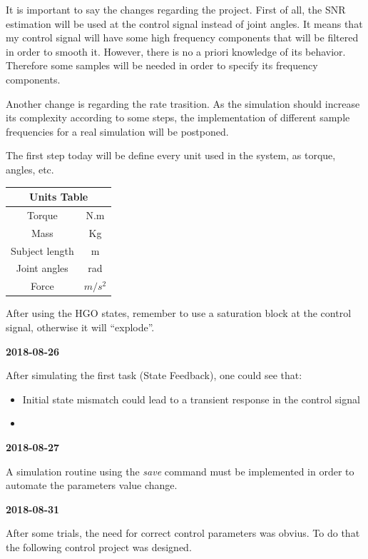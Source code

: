 It is important to say the changes regarding the project. First of all, the SNR estimation will be used at the control signal instead of joint angles. It means that my control signal will have some high frequency components that will be filtered in order to smooth it. However, there is no a priori knowledge of its behavior. Therefore some samples will be needed in order to specify its frequency components.

Another change is regarding the rate trasition. As the simulation should increase its complexity according to some steps, the implementation of different sample frequencies for a real simulation will be postponed.

The first step today will be define every unit used in the system, as torque, angles, etc.

\begin{table}[h]
    \centering
    \begin{tabular}{|c|c|}
    \hline
    \multicolumn{2}{|c|}{Units Table} \\ \hline
    Torque            & N.m     \\ \hline
    Mass              & Kg       \\ \hline
    Subject length    & m        \\ \hline
    Joint angles      & rad      \\ \hline
    Force             & $m/s^{2}$\\ \hline
    \end{tabular}
\end{table}

After using the HGO states, remember to use a saturation block at the control signal, otherwise it will ``explode''.

\textbf{2018-08-26}

After simulating the first task (State Feedback), one could see that:
\begin{itemize}
    \item Initial state mismatch could lead to a transient response in the control signal
    \item 
\end{itemize}

\textbf{2018-08-27}

A simulation routine using the \textit{save} command  must be implemented in order to automate the parameters value change.

\textbf{2018-08-31}

After some trials, the need for correct control parameters was obvius. To do that the following control project was designed.

